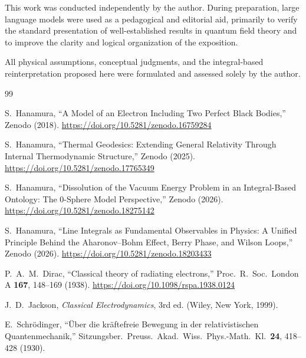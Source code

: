\documentclass[12pt,a4paper]{article}
\begin{document}
This work was conducted independently by the author. During preparation, large language models were used as a pedagogical and editorial aid, primarily to verify the standard presentation of well-established results in quantum field theory and to improve the clarity and logical organization of the exposition.

All physical assumptions, conceptual judgments, and the integral-based reinterpretation proposed here were formulated and assessed solely by the author.

\clearpage

\begin{thebibliography}{99}


S.~Hanamura,
``A Model of an Electron Including Two Perfect Black Bodies,''
Zenodo (2018).
\href{https://doi.org/10.5281/zenodo.16759284}{https://doi.org/10.5281/zenodo.16759284}

S.~Hanamura,
``Thermal Geodesics: Extending General Relativity Through Internal Thermodynamic Structure,''
Zenodo (2025).
\href{https://doi.org/10.5281/zenodo.17765349}{https://doi.org/10.5281/zenodo.17765349}

S.~Hanamura,
``Dissolution of the Vacuum Energy Problem in an Integral-Based Ontology: The 0-Sphere Model Perspective,''
Zenodo (2026).
\href{https://doi.org/10.5281/zenodo.18275142}{https://doi.org/10.5281/zenodo.18275142}

S.~Hanamura,
``Line Integrals as Fundamental Observables in Physics: A Unified Principle Behind the Aharonov--Bohm Effect, Berry Phase, and Wilson Loops,''
Zenodo (2026).
\href{https://doi.org/10.5281/zenodo.18203433}{https://doi.org/10.5281/zenodo.18203433}

P.~A.~M.~Dirac,
``Classical theory of radiating electrons,''
Proc.\ R.\ Soc.\ London A \textbf{167}, 148--169 (1938).
\href{https://doi.org/10.1098/rspa.1938.0124}{https://doi.org/10.1098/rspa.1938.0124}

J.~D.~Jackson,
\textit{Classical Electrodynamics}, 3rd ed.
(Wiley, New York, 1999).

E.~Schr\"odinger,
``\"Uber die kr\"aftefreie Bewegung in der relativistischen Quantenmechanik,''
Sitzungsber.\ Preuss.\ Akad.\ Wiss.\ Phys.-Math.\ Kl.\ \textbf{24}, 418--428 (1930).


\end{thebibliography}
\end{document}
